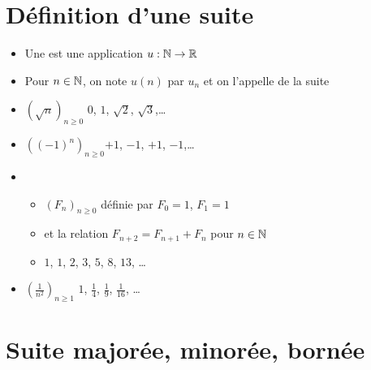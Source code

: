 \section{Définition d'une suite}

\begin{frame}

\begin{mydefinition}
    \begin{itemize}
      \item Une  est une application $u:\mathbb{N}\to \mathbb{R}$
\pause
      \item Pour $n\in \mathbb{N}$, on note $u(n)$ par $u_n$ et on l'appelle  de la suite
    \end{itemize}
\end{mydefinition}

\pause
\medskip

\begin{exemple}
    \begin{itemize}
      \setlength{\itemsep}{7pt} 
      \item $(\sqrt{n})_{n\geq 0}$ \qquad $0$, $1$, $\sqrt2$, $\sqrt3$,\ldots
      
\pause

      \item $((-1)^n)_{n\geq 0}$\qquad $+1$, $-1$, $+1$, $-1$,\ldots
   
\pause   
   
      \item 
      \begin{itemize}
        \item $(F_n)_{n\geq 0}$ définie par $F_0=1$, $F_1=1$ 
        \pause
        \item et la relation $F_{n+2}=F_{n+1}+F_n$  pour $n\in \mathbb{N}$
        \pause
        \item $1$, $1$, $2$, $3$, $5$, $8$, $13$, \ldots 
      \end{itemize}
\pause 
 
      \item $\left(\frac{1}{n^2}\right)_{n\geq 1}$ \qquad  $1$, $\frac14$, $\frac19$, $\frac{1}{16}$, \ldots

    \end{itemize}
\end{exemple}
\end{frame}

\section{Suite majorée, minorée, bornée}

